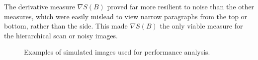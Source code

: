 The derivative measure $\nabla S(B)$ proved far more resilient to noise than the
other measures, which were easily mislead to view narrow paragraphs from the
top or bottom, rather than the side.
This made $\nabla S(B)$ the only viable measure for the hierarchical scan or noisy
images.

\begin{comment}
The entropy measure $E(B)$ performed significantly worse in all the above
measures.  $S(B)$ and $S_d(B)$ always responded well with the $S(B)$ measure
deteriorating rapidly as the image became noisier. CHECK JOEY.  $S_d(B)$
responded best even in presence of noise and is also more efficient to compute.
The confidence of each of the vanishing points with regard to the binarised text
in \reffig{runbin} is plotted in \reffig{ppmap}, where darker pixels represent a
larger squared-sum, and a more likely vanishing point.
\end{comment}


\begin{figure}[t!]
\centering
\begin{center}
\hspace*{2mm}
\hspace*{2mm}
\end{center}
\vspace*{0mm}
\caption{Examples of simulated images used for performance analysis.}
\label{simimages}
\end{figure}

